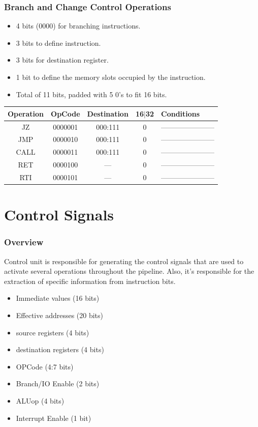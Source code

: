 \documentclass[12pt]{report}
\begin{document}
\section{Branch and Change Control Operations}
\begin{itemize}
    \item 4 bits (0000) for branching instructions.
    \item 3 bits to define instruction.
    \item 3 bits for destination register.
    \item 1 bit to define the memory slots occupied by the instruction.
    \item Total of 11 bits, padded with 5 0's to fit 16 bits. 
\end{itemize}
\begin{center}
 \begin{tabular}{||c| c| c| c| p{40mm}||} 
 \hline
 Operation & OpCode & Destination & 16$|$32 & Conditions  \\ [0.5ex] 
 \hline\hline
 JZ & 0000001 & 000:111 & 0 & ----------------------- \\
 \hline
 JMP & 0000010 & 000:111 & 0 & ----------------------- \\
 \hline
 CALL & 0000011 & 000:111 & 0 & ----------------------- \\
 \hline
 RET & 0000100 & --- & 0 & ----------------------- \\
 \hline
 RTI & 0000101 & --- & 0 & ----------------------- \\
 \hline
\end{tabular}
\end{center}

\part{Control Signals}

\section{Overview}
Control unit is responsible for generating the control signals that are used to activate several operations throughout the pipeline. Also, it's responsible for the extraction of specific information from instruction bits.
\begin{itemize}
    \item Immediate values (16 bits)
    \item Effective addresses (20 bits)
    \item source registers (4 bits)
    \item destination registers (4 bits)
    \item OPCode (4:7 bits)
    \item Branch/IO Enable (2 bits)
    \item ALUop (4 bits)
    \item Interrupt Enable (1 bit)
\end{itemize}
\end{document}
